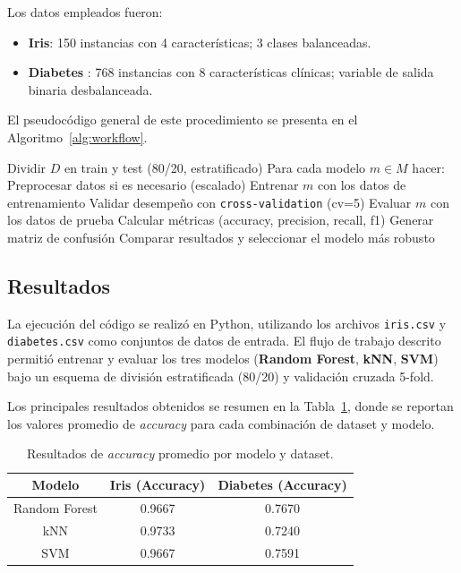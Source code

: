 \documentclass[a4paper,12pt]{article}
\begin{document}
Los datos empleados fueron:
\begin{itemize}
    \item \textbf{Iris}: 150 instancias con 4 características; 3 clases balanceadas.
    \item \textbf{Diabetes  }: 768 instancias con 8 características clínicas; variable de salida binaria desbalanceada.
\end{itemize}

El pseudocódigo general de este procedimiento se presenta en el Algoritmo~\ref{alg:workflow}.  

\vspace{0.5cm}

\begin{algorithm}[H]
\caption{Flujo de trabajo supervisado}
\label{alg:workflow}

Dividir $D$ en train y test (80/20, estratificado)\;
Para cada modelo $m \in M$ hacer:\;
\Indp
    Preprocesar datos si es necesario (escalado)\;
    Entrenar $m$ con los datos de entrenamiento\;
    Validar desempeño con \texttt{cross-validation} (cv=5)\;
    Evaluar $m$ con los datos de prueba\;
    Calcular métricas (accuracy, precision, recall, f1)\;
    Generar matriz de confusión\;
\Indm
Comparar resultados y seleccionar el modelo más robusto\;
\end{algorithm}

\subsection{Resultados}
La ejecución del código se realizó en Python, utilizando los archivos \texttt{iris.csv} y \texttt{diabetes.csv} como conjuntos de datos de entrada.  
El flujo de trabajo descrito permitió entrenar y evaluar los tres modelos (\textbf{Random Forest}, \textbf{kNN}, \textbf{SVM}) bajo un esquema de división estratificada (80/20) y validación cruzada 5-fold.  

Los principales resultados obtenidos se resumen en la Tabla~\ref{tab:resultados}, donde se reportan los valores promedio de \textit{accuracy} para cada combinación de dataset y modelo.  

\begin{table}[H]
    \centering
    \caption{Resultados de \textit{accuracy} promedio por modelo y dataset.}
    \label{tab:resultados}
    \begin{tabular}{|c|c|c|}
        \hline
        \textbf{Modelo} & \textbf{Iris (Accuracy)} & \textbf{Diabetes (Accuracy)} \\ \hline
        Random Forest & 0.9667 & 0.7670 \\ \hline
        kNN           & 0.9733 & 0.7240 \\ \hline
        SVM           & 0.9667 & 0.7591 \\ \hline
    \end{tabular}
\end{table}
\end{document}
